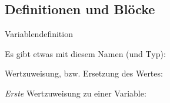 \subsection{Definitionen und Blöcke}
\begin{frame}[c]{Variablendefinition}
   \begin{description}[Initialisierung]
      \itemsep=12pt
      \item<2->[Deklaration] Es gibt etwas mit diesem Namen (und Typ):\\
      \item<4->[Zuweisung] Wertzuweisung, bzw. Ersetzung des Wertes:\\
      \item<6->[Initialisierung] \textit{Erste} Wertzuweisung zu einer Variable:\\
   \end{description}\medskip
   \begin{center}
   \end{center}
\end{frame}

